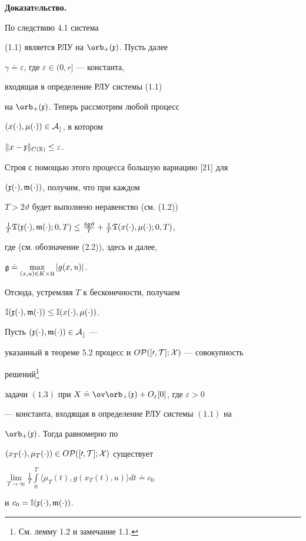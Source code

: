{\bf Доказатeльство.}


По следствию 4.1 система


(1.1) является РЛУ на $\orb_+(\frak x)$. Пусть далее


$\gamma\doteq\varepsilon$, где $\varepsilon\in(0,r]$ --- константа,


входящая в определение РЛУ системы (1.1)


на $\orb_+(\frak x)$. Теперь рассмотрим любой процесс


$(x(\cdot),\mu(\cdot))\in\cal A_c$, в котором


$\|x-\frak x\|_{C(\Bbb R)}\le\varepsilon$.


Строя с помощью этого процесса большую вариацию [21] для


$(\frak x(\cdot),\frak m(\cdot))$, получим, что при каждом


$T>2\vartheta$ будет выполнено неравенство (см. (1.2))


$\frac{1}{T}\frak T(\frak x(\cdot),\frak m(\cdot);0,T)


\le\frac{4\frak g\vartheta}{T}+


\frac{1}{T}\frak T(x(\cdot),\mu(\cdot);0,T)$,


где (см. обозначение (2.2)), здесь и далее,


$\frak g\doteq\max\limits_{(x,u)\in K\times\frak U}|g(x,u)|$.


Отсюда, устремляя $T$ к бесконечности, получаем


$\Bbb I(\frak x(\cdot),\frak m(\cdot))


\le\Bbb I(x(\cdot),\mu(\cdot))$.








\begin{thms}


Пусть $(\frak x(\cdot),\frak m(\cdot))\in\cal A_c$ ---


указанный в теореме $5.2$ процесс и $O\cal P([0,T];X)$ --- совокупность 


решений\footnote{См. лемму 1.2 и замечание 1.1.}


задачи $(1.3)$ при $X\doteq\ov\orb_+(\frak x)


+O_{\varepsilon}[0]$, где $\varepsilon>0$


--- константа, входящая в определение РЛУ системы $(1.1)$ на


$\orb_+(\frak x)$. Тогда равномерно по


$(x_T(\cdot),\mu_T(\cdot))\in O\cal P([0,T];X)$ существует


$\lim\limits_{T\to\infty}\frac{1}{T}


\int\limits_0^T\langle\mu_T(t),g(x_T(t),u)\rangle dt\doteq c_0$


и $c_0=\Bbb I(\frak x(\cdot),\frak m(\cdot))$.


\end{thms}








